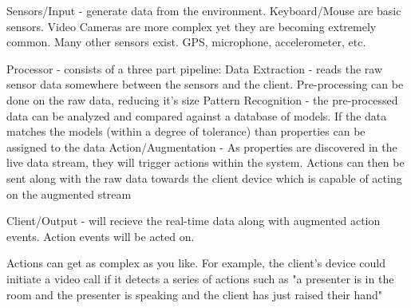 \documentclass[a4paper,12pt]{report}
\begin{document}
Sensors/Input - generate data from the environment. Keyboard/Mouse are basic sensors. Video Cameras are more complex yet they are becoming extremely common. Many other sensors exist. GPS, microphone, accelerometer, etc.

Processor - consists of a three part pipeline:
	Data Extraction - reads the raw sensor data somewhere between the sensors and the client. Pre-processing can be done on the raw data, reducing it's size
	Pattern Recognition - the pre-processed data can be analyzed and compared against a database of models. If the data matches the models (within a degree of tolerance) than properties can be assigned to the data
	Action/Augmentation - As properties are discovered in the live data stream, they will trigger actions within the system. Actions can then be sent along with the raw data towards the client device which is capable of acting on the augmented stream

Client/Output - will recieve the real-time data along with augmented action events. Action events will be acted on.

Actions can get as complex as you like. For example, the client's device could initiate a video call if it detects a series of actions such as "a presenter is in the room and the presenter is speaking and the client has just raised their hand"




\end{document}
